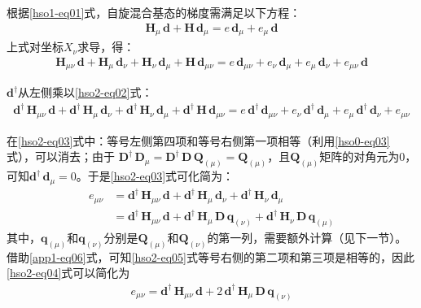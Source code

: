 \documentclass[UTF8]{ctexart}
\begin{document}
根据\eqref{hso1-eq01}式，自旋混合基态的梯度需满足以下方程：
\begin{align}\label{hso2-eq01}
\mathbf{H}_\mu \, \mathbf{d} + \mathbf{H} \, \mathbf{d}_\mu = e \, \mathbf{d}_\mu + e_\mu \, \mathbf{d}
\end{align}
上式对坐标$X_\nu$求导，得：
\begin{align}\label{hso2-eq02}
\mathbf{H}_{\mu\nu} \, \mathbf{d} + \mathbf{H}_{\mu} \, \mathbf{d}_{\nu} +
\mathbf{H}_{\nu} \, \mathbf{d}_\mu + \mathbf{H} \, \mathbf{d}_{\mu\nu}
= e \, \mathbf{d}_{\mu\nu} + e_{\nu} \, \mathbf{d}_\mu +
 e_\mu \, \mathbf{d}_{\nu} + e_{\mu\nu} \, \mathbf{d}
\end{align}

$\mathbf{d}^\dagger$从左侧乘以\eqref{hso2-eq02}式：
\begin{align}\label{hso2-eq03}
\mathbf{d}^\dagger \, \mathbf{H}_{\mu\nu} \, \mathbf{d} + \mathbf{d}^\dagger \, \mathbf{H}_{\mu} \, \mathbf{d}_{\nu} +
\mathbf{d}^\dagger \, \mathbf{H}_{\nu} \, \mathbf{d}_\mu + \mathbf{d}^\dagger \, \mathbf{H} \, \mathbf{d}_{\mu\nu}
= e \, \mathbf{d}^\dagger \, \mathbf{d}_{\mu\nu} + e_{\nu} \, \mathbf{d}^\dagger \, \mathbf{d}_\mu +
e_\mu \, \mathbf{d}^\dagger \, \mathbf{d}_{\nu} + e_{\mu\nu}
\end{align}

在\eqref{hso2-eq03}式中：等号左侧第四项和等号右侧第一项相等（利用\eqref{hso0-eq03}式），可以消去；由于
$\mathbf{D}^\dagger \, \mathbf{D}_\mu = \mathbf{D}^\dagger \, \mathbf{D} \, \mathbf{Q}_{(\mu)} = \mathbf{Q}_{(\mu)}$，且$\mathbf{Q}_{(\mu)}$矩阵的对角元为0，可知$\mathbf{d}^\dagger \, \mathbf{d}_\mu = 0$。于是\eqref{hso2-eq03}式可化简为：
\begin{align}\label{hso2-eq04}
e_{\mu\nu} &= \mathbf{d}^\dagger \, \mathbf{H}_{\mu\nu} \, \mathbf{d} + \mathbf{d}^\dagger \, \mathbf{H}_{\mu} \, \mathbf{d}_{\nu} +
\mathbf{d}^\dagger \, \mathbf{H}_{\nu} \, \mathbf{d}_\mu \\ \label{hso2-eq05}
&= \mathbf{d}^\dagger \, \mathbf{H}_{\mu\nu} \, \mathbf{d} + \mathbf{d}^\dagger \, \mathbf{H}_{\mu} \, \mathbf{D} \, \mathbf{q}_{(\nu)} +
\mathbf{d}^\dagger \, \mathbf{H}_{\nu} \, \mathbf{D} \, \mathbf{q}_{(\mu)}
\end{align}
其中，$\mathbf{q}_{(\mu)}$和$\mathbf{q}_{(\nu)}$分别是$\mathbf{Q}_{(\mu)}$和$\mathbf{Q}_{(\nu)}$的第一列，需要额外计算（见下一节）。
借助\eqref{app1-eq06}式，可知\eqref{hso2-eq05}式等号右侧的第二项和第三项是相等的，因此\eqref{hso2-eq04}式可以简化为
\begin{align}\label{hso2-eq06}
e_{\mu\nu} = \mathbf{d}^\dagger \, \mathbf{H}_{\mu\nu} \, \mathbf{d} + 2 \, \mathbf{d}^\dagger \, \mathbf{H}_{\mu} \, \mathbf{D} \, \mathbf{q}_{(\nu)}
\end{align}
\end{document}

